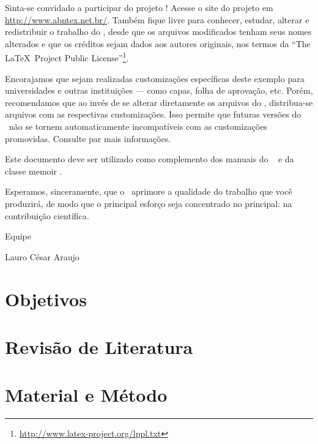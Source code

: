 \documentclass[
	12pt,				%
	openright,			%
	oneside,			%
	a4paper,			%
	english,			%
	french,				%
	spanish,			%
	brazil				%
	]{abntex2}
\begin{document}
Sinta-se convidado a participar do projeto \abnTeX! Acesse o site do projeto em
\url{http://www.abntex.net.br/}. Também fique livre para conhecer,
estudar, alterar e redistribuir o trabalho do \abnTeX, desde que os arquivos
modificados tenham seus nomes alterados e que os créditos sejam dados aos
autores originais, nos termos da ``The \LaTeX\ Project Public
License''\footnote{\url{http://www.latex-project.org/lppl.txt}}.

Encorajamos que sejam realizadas customizações específicas deste exemplo para
universidades e outras instituições --- como capas, folha de aprovação, etc.
Porém, recomendamos que ao invés de se alterar diretamente os arquivos do
\abnTeX, distribua-se arquivos com as respectivas customizações.
Isso permite que futuras versões do \abnTeX~não se tornem automaticamente
incompatíveis com as customizações promovidas. Consulte
 par mais informações.

Este documento deve ser utilizado como complemento dos manuais do \abnTeX\ 
\cite{abntex2classe,abntex2cite,abntex2cite-alf} e da classe \textsf{memoir}
\cite{memoir}. 

Esperamos, sinceramente, que o \abnTeX\ aprimore a qualidade do trabalho que
você produzirá, de modo que o principal esforço seja concentrado no principal:
na contribuição científica.

Equipe \abnTeX 

Lauro César Araujo


\chapter{Objetivos}
\lipsum[1-3]



\chapter{Revisão de Literatura}
\lipsum[4-6]


\chapter{Material e Método}
\lipsum[7-9]
\end{document}
